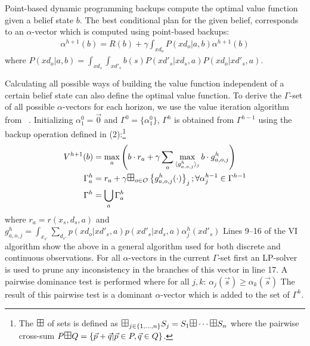 \documentclass{article} %
\begin{document}
Point-based dynamic programming backups compute the optimal value function given a belief state $b$. The best conditional plan for the given belief, corresponds to an $\alpha$-vector which is computed using point-based backups: 
{\footnotesize
\begin{align*}
\alpha^{h+1}(b) = R(b) + \gamma \int_{xd_o} P(xd_o|a,b)\alpha^{h+1}(b)\nonumber
\end{align*}
}
where $P(xd_o|a,b) = \int_{xd_s}\int_{xd'_s}b(s)P(xd'_s|xd_s,a)P(xd_o|xd'_s,a)$.

Calculating all possible ways of building the value function independent of a certain belief state can also define the optimal value function. To derive the $\Gamma$-set of all possible $\alpha$-vectors for each horizon, we use the value iteration algorithm from ~\cite{monahan82}. Initializing  $\alpha^0_1 = \vec{0}$ and $\Gamma^0 = \{ \alpha^0_1 \}$, $\Gamma^h$ is obtained from $\Gamma^{h-1}$ using the backup operation defined in (2):\footnote{The $\textrm{\large $\boxplus$}$ of sets is defined as 
$\textrm{\large $\boxplus$}_{j \in \{ 1,\ldots, n \} } S_j = S_1 \textrm{\large $\boxplus$} \cdots \textrm{\large $\boxplus$} S_n$ where the pairwise cross-sum $P 
\textrm{\large $\boxplus$} Q = \{ \vec{p} + \vec{q} | \vec{p} \in P, \vec{q} \in Q \}$.}
{\footnotesize
\begin{align}
V^{h+1}(b) &= \max_a \left( b \cdot r_a + 
\gamma \sum_o \max_{\langle g^h_{a,o,j} \rangle_j}  b \cdot g^h_{a,o,j} \right) \\
\Gamma^{h}_a   &= r_a + \gamma \textrm{\large $\boxplus$}_{o \in \mathcal{O}} \left\{ g^h_{a,o,j}(\cdot) \right\}_j ;  \forall \alpha^{h-1}_{j} \in \Gamma^{h-1}  \\
\Gamma^h  &= \bigcup_a \Gamma^h_a 
\end{align}
}
where $r_a = r(x_s,d_s,a)$ and  
$g^h_{a,o,j} =  \int_{x_{s'}} \sum_{d_{s'}} p(xd_o|xd'_s,a)p(xd'_s|xd_s,a) \alpha^h_j(xd'_s)$
Lines 9--16 of the \textsc{VI} algorithm show the above in a general algorithm used for both discrete and continuous observations. 
For all $\alpha$-vectors in the current $\Gamma$-set first an LP-solver is used to prune any inconsistency in the branches of this vector in line 17. A pairwise dominance test is performed where for all $j,k$: $\alpha_j(\vec{s}) \geq \alpha_k(\vec{s})$
The result of this pairwise test is a dominant $\alpha$-vector which is added to the set of $\Gamma^h$. 
\end{document}
